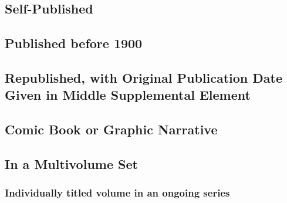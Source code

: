 \documentclass{article}
\begin{document}
\subsection{Self-Published} %
\label{ssub:self_published}
\begin{refsection}
	\printbibliography[heading=none]
\end{refsection}
\subsection{Published before 1900} %
\label{ssub:published_before_1900}
\begin{refsection}
	\printbibliography[heading=none]
\end{refsection}
\subsection{Republished, with Original Publication Date Given in Middle Supplemental Element} %
\label{ssub:republished_with_original_publication_date_given_in_middle_supplemental_element}
\begin{refsection}
	\printbibliography[heading=none]
\end{refsection}
\subsection{Comic Book or Graphic Narrative} %
\label{ssub:comic_book_or_graphic_narrative}
\begin{refsection}
	\printbibliography[heading=none]
\end{refsection}
\subsection{In a Multivolume Set} %
\label{sub:in_a_multivolume_set}
\subsubsection{Individually titled volume in an ongoing series} %
\label{ssub:individually_titled_volume_in_an_ongoing_series}
\begin{refsection}
	\printbibliography[heading=none]
\end{refsection}
\end{document}
